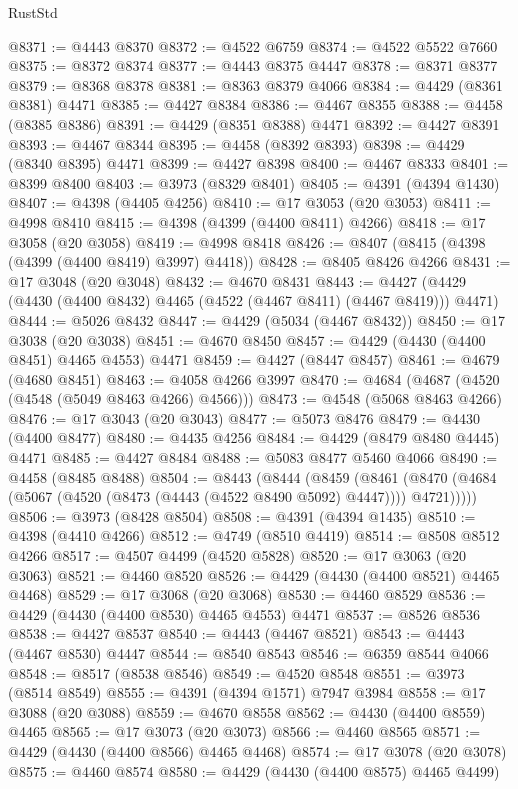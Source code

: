 \begin{lexlean}{RustStd}
\begin{coremodule}
@8371 := @4443 @8370
@8372 := @4522 @6759
@8374 := @4522 @5522 @7660
@8375 := @8372 @8374
@8377 := @4443 @8375 @4447
@8378 := @8371 @8377
@8379 := @8368 @8378
@8381 := @8363 @8379 @4066
@8384 := @4429 (@8361 @8381) @4471
@8385 := @4427 @8384
@8386 := @4467 @8355
@8388 := @4458 (@8385 @8386)
@8391 := @4429 (@8351 @8388) @4471
@8392 := @4427 @8391
@8393 := @4467 @8344
@8395 := @4458 (@8392 @8393)
@8398 := @4429 (@8340 @8395) @4471
@8399 := @4427 @8398
@8400 := @4467 @8333
@8401 := @8399 @8400
@8403 := @3973 (@8329 @8401)
@8405 := @4391 (@4394 @1430)
@8407 := @4398 (@4405 @4256)
@8410 := @17 @3053 (@20 @3053)
@8411 := @4998 @8410
@8415 := @4398 (@4399 (@4400 @8411) @4266)
@8418 := @17 @3058 (@20 @3058)
@8419 := @4998 @8418
@8426 := @8407 (@8415 (@4398 (@4399 (@4400 @8419) @3997) @4418))
@8428 := @8405 @8426 @4266
@8431 := @17 @3048 (@20 @3048)
@8432 := @4670 @8431
@8443 := @4427 (@4429 (@4430 (@4400 @8432) @4465 (@4522 (@4467 @8411) (@4467 @8419))) @4471)
@8444 := @5026 @8432
@8447 := @4429 (@5034 (@4467 @8432))
@8450 := @17 @3038 (@20 @3038)
@8451 := @4670 @8450
@8457 := @4429 (@4430 (@4400 @8451) @4465 @4553) @4471
@8459 := @4427 (@8447 @8457)
@8461 := @4679 (@4680 @8451)
@8463 := @4058 @4266 @3997
@8470 := @4684 (@4687 (@4520 (@4548 (@5049 @8463 @4266) @4566)))
@8473 := @4548 (@5068 @8463 @4266)
@8476 := @17 @3043 (@20 @3043)
@8477 := @5073 @8476
@8479 := @4430 (@4400 @8477)
@8480 := @4435 @4256
@8484 := @4429 (@8479 @8480 @4445) @4471
@8485 := @4427 @8484
@8488 := @5083 @8477 @5460 @4066
@8490 := @4458 (@8485 @8488)
@8504 := @8443
    (@8444
      (@8459
        (@8461 (@8470 (@4684 (@5067 (@4520 (@8473 (@4443 (@4522 @8490 @5092) @4447)))) @4721)))))
@8506 := @3973 (@8428 @8504)
@8508 := @4391 (@4394 @1435)
@8510 := @4398 (@4410 @4266)
@8512 := @4749 (@8510 @4419)
@8514 := @8508 @8512 @4266
@8517 := @4507 @4499 (@4520 @5828)
@8520 := @17 @3063 (@20 @3063)
@8521 := @4460 @8520
@8526 := @4429 (@4430 (@4400 @8521) @4465 @4468)
@8529 := @17 @3068 (@20 @3068)
@8530 := @4460 @8529
@8536 := @4429 (@4430 (@4400 @8530) @4465 @4553) @4471
@8537 := @8526 @8536
@8538 := @4427 @8537
@8540 := @4443 (@4467 @8521)
@8543 := @4443 (@4467 @8530) @4447
@8544 := @8540 @8543
@8546 := @6359 @8544 @4066
@8548 := @8517 (@8538 @8546)
@8549 := @4520 @8548
@8551 := @3973 (@8514 @8549)
@8555 := @4391 (@4394 @1571) @7947 @3984
@8558 := @17 @3088 (@20 @3088)
@8559 := @4670 @8558
@8562 := @4430 (@4400 @8559) @4465
@8565 := @17 @3073 (@20 @3073)
@8566 := @4460 @8565
@8571 := @4429 (@4430 (@4400 @8566) @4465 @4468)
@8574 := @17 @3078 (@20 @3078)
@8575 := @4460 @8574
@8580 := @4429 (@4430 (@4400 @8575) @4465 @4499)

\end{coremodule}
\end{lexlean}
